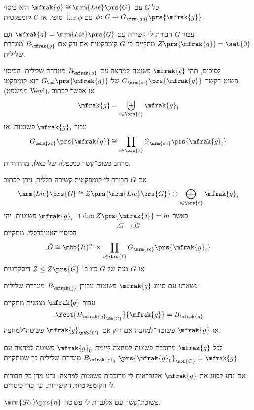 \documentclass[10pt, twoside]{book}
\newcommand{\textenglish}[1]{\foreignlanguage{english}{#1}}
\newcommand{\Lie}{\mrm{Lie}}
\begin{document}
\begin{proposition}
כל
$G$
עם
$\mfrak{g} \cong \Lie\prs{G}$
היא כיסוי
$\phi \colon G \to G_{\mrm{ad}}\prs{\mfrak{g}}$
עם
$\ker \phi$
סופי.
אז
$G$
קומפקטית.
\end{proposition}

\begin{corollary}
עבור
$G$
חבורת לי קשירה עם
$\mfrak{g} = \Lie\prs{G}$
וגם
$Z\prs{\mfrak{g}} = \set{0}$
מתקיים כי
$G$
קומפקטית אם ורק אם
$B_{\mfrak{g}}$
מוגדרת שלילית.
\end{corollary}

לסיכום, תהי
$\mfrak{g}$
פשוטה־למחצה עם
$B_{\mfrak{g}}$
מוגדרת שלילית. הכיסוי פשוט־הקשר
$G_{\mrm{sc}}\prs{\mfrak{g}}$
של
$G_{\ad}\prs{\mfrak{g}}$
הוא קומפקטי (ממשפט \textenglish{Weyl}).
אז אפשר לכתוב
\[\mfrak{g} = \biguplus_{i \in \brs{\ell}} \mfrak{g}_i\]
עבור
$\mfrak{g}_i$
פשוטות.
אז
\[G_{\mrm{sc}}\prs{\mfrak{g}} \cong \prod_{i \in \brs{\ell}} G_{\mrm{sc}}\prs{\mfrak{g}_i}\]
מרחב פשוט־קשר כמכפלה של כאלו, מהיחידות.

אם
$G$
חבורת לי קומפקטית קשירה כללית, ניתן לכתוב
\[\Lie\prs{G} \cong Z\prs{\Lie\prs{G}} \oplus \bigoplus_{i \in \brs{\ell}} \mfrak{g}_i\]
כאשר
$\dim Z\prs{\mfrak{g}} = m$
ו־%
$\mfrak{g}_i$
פשוטות.
יהי
\[\text{.} \tilde{G} \to G\]
הכיסוי האוניברסלי.
מתקיים
\[\text{.} \tilde{G} \cong \mbb{R}^m \times \prod_{i \in \brs{\ell}} G_{\mrm{sc}}\prs{\mfrak{g}_i}\]
אז
$G$
מנה של
$\tilde{G}$
כזו ב־%
$Z \leq Z\prs{\tilde{G}}$
דיסקרטית.

נשארנו עם סיווג
$\mfrak{g}$
פשוטות עבורן
$B_{\mfrak{g}}$
מוגדרת־שלילית.

\begin{observation}
עבור
$\mfrak{g}$
ממשית מתקיים
\[\text{.} \rest{B_{\mfrak{g}_{\mbb{C}}}}{\mfrak{g}} = B_{\mfrak{g}}\]
אז
$\mfrak{g}$
פשוטה־למחצה אם ורק אם
$\mfrak{g}_{\mbb{C}}$
פשוטה־למחצה.
\end{observation}

\begin{theorem}
לכל
$\mfrak{g}$
מרוכבת פשוטה־למחצה קיימת
$\mfrak{g}_0$
פשוטה־למחצה עם
$B_{\mfrak{g}_0}$
מוגדרת־שלילית כך שמתקיים
$\prs{\mfrak{g}_0}_{\mbb{C}} = \mfrak{g}$.
\end{theorem}

\begin{corollary}
אם נדע לסווג את
$\mfrak{g}$
אלגבראות לי מרוכבות פשוטות־למחצה, נדע מהן כל חבורות לי הקומפקטיות הקשירות, עד כדי כיסויים.
\end{corollary}

\begin{example}
$\mrm{SU}\prs{n}$
פשוטת־קשר עם אלגברת לי פשוטה.
\end{example}
\end{document}
